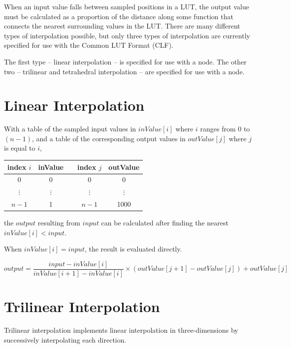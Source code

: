 \label{appendix:interpolation}

When an input value falls between sampled positions in a LUT, the output value must be calculated as a proportion of the distance along some function that connects the nearest surrounding values in the LUT. There are many different types of interpolation possible, but only three types of interpolation are currently specified for use with the Common LUT Format (CLF). 

The first type -- linear interpolation -- is specified for use with a  node. The other two -- trilinear and tetrahedral interpolation -- are specified for use with a  node.

\section{Linear Interpolation}
With a table of the sampled input values in $inValue[i]$ where $i$ ranges from $0$ to $(n-1)$, and a table of the corresponding output values in $outValue[j]$ where $j$ is equal to $i$,

\begin{center}
\begin{tabularx}{3in}{ccXcc}
	index $i$ & inValue && index $j$ & outValue \\ \hline
	0 & 0 && 0 & 0 \\
	$\vdots$ & $\vdots$ && $\vdots$ & $\vdots$ \\
	$n-1$ & 1 && $n-1$ & 1000 \\
\end{tabularx}
\end{center}

the $output$ resulting from $input$ can be calculated after finding the nearest $inValue[i] < input$. 

When $inValue[i] = input$, the result is evaluated directly.

\begin{center}
$output = \dfrac{input-inValue[i]}{inValue[i+1]-inValue[i]} \times (outValue[j+1]-outValue[j])+outValue[j]$	
\end{center}

\section{Trilinear Interpolation}
Trilinear interpolation implements linear interpolation in three-dimensions by successively interpolating each direction. 

